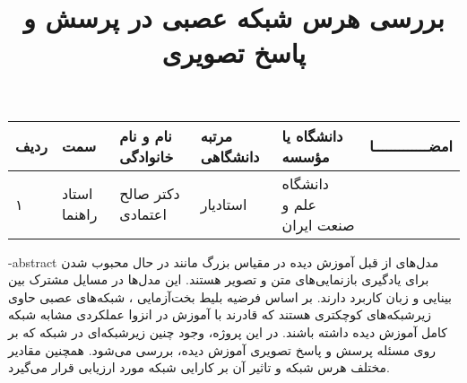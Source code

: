 



\subject{مهندسی کامپیوتر}


\title{بررسی هرس شبکه عصبی در پرسش و پاسخ تصویری}







\besmPage

\vspace{.5cm}

\begin{center}
	\begin{tabular}{| p{8mm} | p{18mm} | p{} |p{14mm}|p{}|c|}
		\hline
		ردیف	& سمت & نام و نام خانوادگی & مرتبه \newline دانشگاهی &	دانشگاه یا مؤسسه &	امضـــــــــــــا\\
		\hline
		۱  &	استاد راهنما & دکتر \newline  صالح اعتمادی & استادیار & دانشگاه \newline علم و صنعت ایران &  \\
		\hline

	\end{tabular}
\end{center}


\fa-abstract{
مدل‌های از قبل آموزش دیده در مقیاس بزرگ مانند
در حال محبوب شدن برای یادگیری بازنمایی‌های متن و تصویر هستند. این مدل‌ها در مسايل مشترک بین بینایی و زبان کاربرد دارند. بر اساس فرضیه بلیط بخت‌آزمایی
،
 شبکه‌های عصبی حاوی زیرشبکه‌های 
 کوچکتری هستند که قادرند با آموزش در انزوا
  عملکردی مشابه شبکه کامل آموزش دیده داشته باشند. در این پروژه، وجود چنین زیرشبکه‌ای در شبکه
   که بر روی مسئله پرسش و پاسخ تصویری آموزش دیده، بررسی می‌شود. همچنین مقادیر مختلف هرس شبکه و تاثیر آن بر کارایی شبکه مورد ارزیابی قرار می‌گیرد.
}

\abstractPage

\newpage\clearpage

